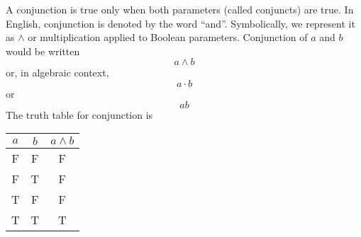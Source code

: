 \documentclass[12pt]{article}
\begin{document}
A conjunction is true only when both parameters (called conjuncts) are true.  In English, conjunction is denoted by the word ``and''.  Symbolically, we represent it as $\land$ or multiplication applied to Boolean parameters.  Conjunction of $a$ and $b$ would be written $$a \land b$$ or, in algebraic context, $$ a \cdot b $$ or $$ ab $$  The truth table for conjunction is 

\begin{center}
\begin{tabular}{ccc}
$a$ & $b$ & $a \land b$ \\
\hline
F & F & F \\
F & T & F \\
T & F & F \\
T & T & T
\end{tabular}
\end{center}
\end{document}
